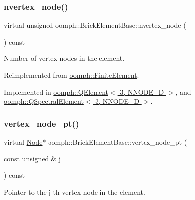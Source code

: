 \subsubsection{\texorpdfstring{nvertex\+\_\+node()}{nvertex\_node()}}
{\footnotesize\ttfamily virtual unsigned oomph\+::\+Brick\+Element\+Base\+::nvertex\+\_\+node (\begin{DoxyParamCaption}{ }\end{DoxyParamCaption}) const\hspace{0.3cm}{\ttfamily [pure virtual]}}



Number of vertex nodes in the element. 



Reimplemented from \hyperlink{classoomph_1_1FiniteElement_a45631a7aa50efc3123a921d114f84cba}{oomph\+::\+Finite\+Element}.



Implemented in \hyperlink{classoomph_1_1QElement_3_013_00_01NNODE__1D_01_4_a70472a8a3a9cd44d853c70b631062e9c}{oomph\+::\+Q\+Element$<$ 3, N\+N\+O\+D\+E\+\_\+D $>$}, and \hyperlink{classoomph_1_1QSpectralElement_3_013_00_01NNODE__1D_01_4_aebf70850f2911827998b2e6c413a1b2a}{oomph\+::\+Q\+Spectral\+Element$<$ 3, N\+N\+O\+D\+E\+\_\+D $>$}.

\mbox{\label{classoomph_1_1BrickElementBase_a3b12dfa7761de6719dd66776488b3bf1}} 
\subsubsection{\texorpdfstring{vertex\+\_\+node\+\_\+pt()}{vertex\_node\_pt()}}
{\footnotesize\ttfamily virtual \hyperlink{classoomph_1_1Node}{Node}$\ast$ oomph\+::\+Brick\+Element\+Base\+::vertex\+\_\+node\+\_\+pt (\begin{DoxyParamCaption}\item[{const unsigned \&}]{j }\end{DoxyParamCaption}) const\hspace{0.3cm}{\ttfamily [pure virtual]}}



Pointer to the j-\/th vertex node in the element. 



